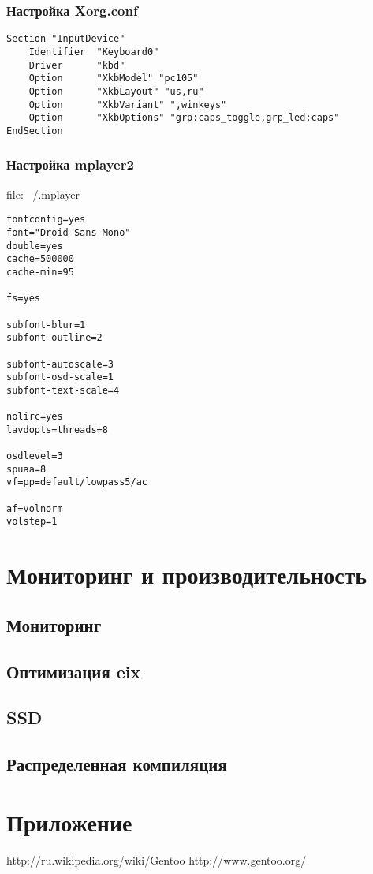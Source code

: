 \documentclass[12pt, a6paper]{article}
\begin{document}
\subsubsection{Настройка Xorg.conf}
\begin{verbatim}
Section "InputDevice"
    Identifier  "Keyboard0"
    Driver      "kbd"
    Option      "XkbModel" "pc105"
    Option      "XkbLayout" "us,ru"
    Option      "XkbVariant" ",winkeys"
    Option      "XkbOptions" "grp:caps_toggle,grp_led:caps"
EndSection
\end{verbatim}


\subsubsection{Настройка mplayer2}
file: ~/.mplayer
\begin{verbatim}
fontconfig=yes
font="Droid Sans Mono"
double=yes
cache=500000
cache-min=95

fs=yes

subfont-blur=1
subfont-outline=2

subfont-autoscale=3
subfont-osd-scale=1
subfont-text-scale=4

nolirc=yes
lavdopts=threads=8

osdlevel=3
spuaa=8
vf=pp=default/lowpass5/ac

af=volnorm
volstep=1
\end{verbatim}

\newpage
\section{Мониторинг и производительность}

\subsection{Мониторинг}

\subsection{Оптимизация eix}

\subsection{SSD}

\subsection{Распределенная компиляция}

\newpage

\section{Приложение}


\newpage
\begin{thebibliography}{99}

	 http://ru.wikipedia.org/wiki/Gentoo
	 http://www.gentoo.org/
	

\end{thebibliography}
\end{document}
